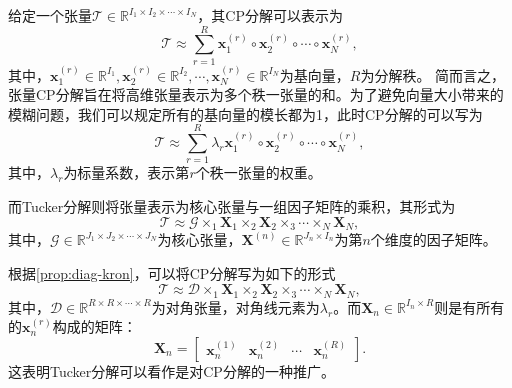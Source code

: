 给定一个张量\(\mathcal{T} \in \mathbb{R}^{I_1 \times I_2 \times \cdots \times I_N}\)，其CP分解可以表示为
\[
    \mathcal{T} \approx \sum_{r=1}^{R} \bm{x}_1^{(r)} \circ \bm{x}_2^{(r)} \circ \cdots \circ \bm{x}_N^{(r)},
\]
其中，\(\bm{x}_1^{(r)} \in \mathbb{R}^{I_1}, \bm{x}_2^{(r)} \in \mathbb{R}^{I_2}, \cdots, \bm{x}_N^{(r)} \in \mathbb{R}^{I_N}\)为基向量，\(R\)为分解秩。 简而言之，张量CP分解旨在将高维张量表示为多个秩一张量的和。为了避免向量大小带来的模糊问题，我们可以规定所有的基向量的模长都为1，此时CP分解的可以写为
\[
    \mathcal{T} \approx \sum_{r=1}^{R} \lambda_r \bm{x}_1^{(r)} \circ \bm{x}_2^{(r)} \circ \cdots \circ \bm{x}_N^{(r)},
\]
其中，\(\lambda_r\)为标量系数，表示第\(r\)个秩一张量的权重。

而Tucker分解则将张量表示为核心张量与一组因子矩阵的乘积，其形式为
\[
    \mathcal{T} \approx \mathcal{G} \times_1 \mathbf{X}_1 \times_2 \mathbf{X}_2 \times_3 \cdots \times_N \mathbf{X}_N,
\]
其中，\(\mathcal{G} \in \mathbb{R}^{J_1 \times J_2 \times \cdots \times J_N}\)为核心张量，\(\mathbf{X}^{(n)} \in \mathbb{R}^{J_n \times I_n}\)为第\(n\)个维度的因子矩阵。

根据\cref{prop:diag-kron}，可以将CP分解写为如下的形式
\[
    \mathcal{T} \approx \mathcal{D} \times_1 \mathbf{X}_1 \times_2 \mathbf{X}_2 \times_3 \cdots \times_N \mathbf{X}_N,
\]
其中，\(\mathcal{D} \in \mathbb{R}^{R \times R \times \cdots \times R}\)为对角张量，对角线元素为\(\lambda_r\)。而\( \mathbf{X}_n \in \mathbb{R}^{I_n \times R} \)则是有所有的\( \bm{x}_n^{(r)} \)构成的矩阵：
\[
    \mathbf{X}_n = \begin{bmatrix} \bm{x}_n^{(1)} & \bm{x}_n^{(2)} & \cdots & \bm{x}_n^{(R)} \end{bmatrix}.
\]
这表明Tucker分解可以看作是对CP分解的一种推广。

